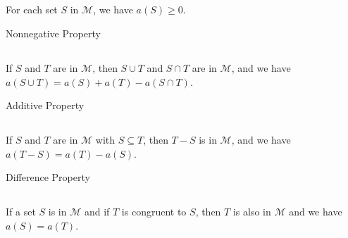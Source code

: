\documentclass{report}
\begin{document}
\subsection{}%
\label{sub:nonnegative-property}

For each set $S$ in $\mathscr{M}$, we have $a(S) \geq 0$.

\begin{axiom}

    {Nonnegative Property}

\end{axiom}

\subsection{}%
\label{sub:area-additive-property}

If $S$ and $T$ are in $\mathscr{M}$, then $S \cup T$ and $S \cap T$ are in
  $\mathscr{M}$, and we have $a(S \cup T) = a(S) + a(T) - a(S \cap T)$.

\begin{axiom}

    {Additive Property}

\end{axiom}

\subsection{}%
\label{sub:area-difference-property}

If $S$ and $T$ are in $\mathscr{M}$ with $S \subseteq T$, then $T - S$ is in
  $\mathscr{M}$, and we have $a(T - S) = a(T) - a(S)$.

\begin{axiom}

    {Difference Property}

\end{axiom}

\subsection{}%
\label{sub:area-invariance-under-congruence}

If a set $S$ is in $\mathscr{M}$ and if $T$ is congruent to $S$, then $T$ is
  also in $\mathscr{M}$ and we have $a(S) = a(T)$.
\end{document}
